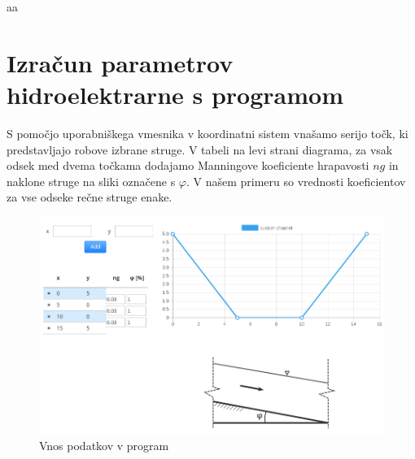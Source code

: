 aa


\section{Izračun parametrov hidroelektrarne s programom}

S pomočjo uporabniškega vmesnika v koordinatni sistem vnašamo serijo točk, ki predstavljajo robove izbrane struge. V tabeli na levi strani diagrama, za vsak odsek med dvema točkama dodajamo Manningove koeficiente hrapavosti $ng$ in naklone struge na sliki označene s $\varphi$. V našem primeru so vrednosti koeficientov za vse odseke rečne struge enake.

\begin{figure}[ht!]
	\begin{centering}
		\includegraphics[width=\textwidth]{slike/izracuni/modeliranjeStruge.png}		
		\caption{Vnos podatkov v program}\label{fig:modeliranjeStruge}
	\end{centering}
\end{figure}
